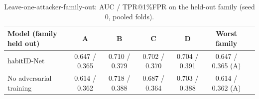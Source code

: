 \begin{table}[t]
\caption{Leave-one-attacker-family-out: AUC / TPR@1\%FPR on the held-out family (seed 0, pooled folds).}
\label{tab:lofo}
\centering
\small
\begin{tabular}{lcccccc}
\toprule
Model (family held out) & A & B & C & D & Worst family \\
\midrule
habitID-Net & 0.647 / 0.365 & 0.710 / 0.379 & 0.702 / 0.370 & 0.704 / 0.391 & 0.647 / 0.365 (A) \\
No adversarial training & 0.614 / 0.362 & 0.718 / 0.388 & 0.687 / 0.364 & 0.703 / 0.388 & 0.614 / 0.362 (A) \\
\bottomrule
\end{tabular}
\end{table}
